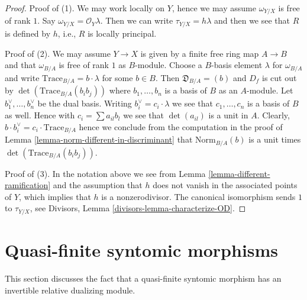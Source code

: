 \begin{proof}
Proof of (1). We may work locally on $Y$, hence we may assume
$\omega_{Y/X}$ is free of rank $1$. Say $\omega_{Y/X} = \mathcal{O}_Y\lambda$.
Then we can write $\tau_{Y/X} = h \lambda$ and then we see that
$R$ is defined by $h$, i.e., $R$ is locally principal.

\medskip\noindent
Proof of (2). We may assume $Y \to X$ is given by a finite free ring
map $A \to B$ and that $\omega_{B/A}$ is free of rank $1$ as $B$-module.
Choose a $B$-basis element $\lambda$ for $\omega_{B/A}$ and write
$\text{Trace}_{B/A} = b \cdot \lambda$ for some $b \in B$.
Then $\mathfrak{D}_{B/A} = (b)$ and $D_f$ is cut out by
$\det(\text{Trace}_{B/A}(b_ib_j))$ where $b_1, \ldots, b_n$ is a
basis of $B$ as an $A$-module. Let $b_1^\vee, \ldots, b_n^\vee$
be the dual basis.
Writing $b_i^\vee = c_i \cdot \lambda$ we see that
$c_1, \ldots, c_n$ is a basis of $B$ as well.
Hence with $c_i = \sum a_{il}b_l$ we see that $\det(a_{il})$
is a unit in $A$. Clearly,
$b \cdot b_i^\vee = c_i \cdot \text{Trace}_{B/A}$
hence we conclude from the computation in the proof of
Lemma \ref{lemma-norm-different-in-discriminant}
that $\text{Norm}_{B/A}(b)$ is a unit times
$\det(\text{Trace}_{B/A}(b_ib_j))$.

\medskip\noindent
Proof of (3). In the notation above we see from
Lemma \ref{lemma-different-ramification} and the assumption
that $h$ does not vanish in
the associated points of $Y$, which implies that $h$ is a nonzerodivisor.
The canonical isomorphism sends $1$ to $\tau_{Y/X}$, see
Divisors, Lemma \ref{divisors-lemma-characterize-OD}.
\end{proof}







\section{Quasi-finite syntomic morphisms}
\label{section-quasi-finite-syntomic}

\noindent
This section discusses the fact that a quasi-finite syntomic morphism
has an invertible relative dualizing module.

